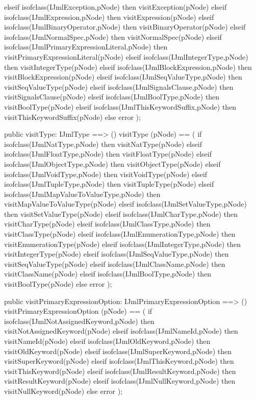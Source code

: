 \begin{vdm_al}
      elseif isofclass(IJmlException,pNode) then visitException(pNode)
      elseif isofclass(IJmlExpression,pNode) then visitExpression(pNode)
      elseif isofclass(IJmlBinaryOperator,pNode) then visitBinaryOperator(pNode)
      elseif isofclass(IJmlNormalSpec,pNode) then visitNormalSpec(pNode)
      elseif isofclass(IJmlPrimaryExpressionLiteral,pNode) then visitPrimaryExpressionLiteral(pNode)
      elseif isofclass(IJmlIntegerType,pNode) then visitIntegerType(pNode)
      elseif isofclass(IJmlBlockExpression,pNode) then visitBlockExpression(pNode)
      elseif isofclass(IJmlSeqValueType,pNode) then visitSeqValueType(pNode)
      elseif isofclass(IJmlSignalsClause,pNode) then visitSignalsClause(pNode)
      elseif isofclass(IJmlBoolType,pNode) then visitBoolType(pNode)
      elseif isofclass(IJmlThisKeywordSuffix,pNode) then visitThisKeywordSuffix(pNode)
      else error );

  public visitType: IJmlType ==> ()
  visitType (pNode) ==
    ( if isofclass(IJmlNatType,pNode) then visitNatType(pNode)
      elseif isofclass(IJmlFloatType,pNode) then visitFloatType(pNode)
      elseif isofclass(IJmlObjectType,pNode) then visitObjectType(pNode)
      elseif isofclass(IJmlVoidType,pNode) then visitVoidType(pNode)
      elseif isofclass(IJmlTupleType,pNode) then visitTupleType(pNode)
      elseif isofclass(IJmlMapValueToValueType,pNode) then visitMapValueToValueType(pNode)
      elseif isofclass(IJmlSetValueType,pNode) then visitSetValueType(pNode)
      elseif isofclass(IJmlCharType,pNode) then visitCharType(pNode)
      elseif isofclass(IJmlClassType,pNode) then visitClassType(pNode)
      elseif isofclass(IJmlEnumerationType,pNode) then visitEnumerationType(pNode)
      elseif isofclass(IJmlIntegerType,pNode) then visitIntegerType(pNode)
      elseif isofclass(IJmlSeqValueType,pNode) then visitSeqValueType(pNode)
      elseif isofclass(IJmlClassName,pNode) then visitClassName(pNode)
      elseif isofclass(IJmlBoolType,pNode) then visitBoolType(pNode)
      else error );

  public visitPrimaryExpressionOption: IJmlPrimaryExpressionOption ==> ()
  visitPrimaryExpressionOption (pNode) ==
    ( if isofclass(IJmlNotAssignedKeyword,pNode) then visitNotAssignedKeyword(pNode)
      elseif isofclass(IJmlNameId,pNode) then visitNameId(pNode)
      elseif isofclass(IJmlOldKeyword,pNode) then visitOldKeyword(pNode)
      elseif isofclass(IJmlSuperKeyword,pNode) then visitSuperKeyword(pNode)
      elseif isofclass(IJmlThisKeyword,pNode) then visitThisKeyword(pNode)
      elseif isofclass(IJmlResultKeyword,pNode) then visitResultKeyword(pNode)
      elseif isofclass(IJmlNullKeyword,pNode) then visitNullKeyword(pNode)
      else error );


\end{vdm_al}
